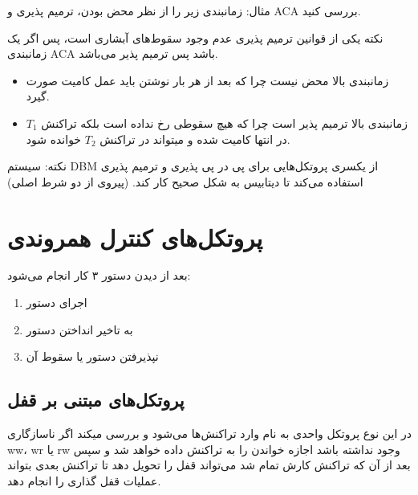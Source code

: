 \documentclass[a4paper]{article}
\begin{document}
مثال: زمانبندی زیر را از نظر محض بودن، ترمیم پذیری و ACA بررسی کنید.

نکته یکی از قوانین ترمیم پذیری عدم وجود سقوط‌های آبشاری است، پس اگر یک زمانبندی
ACA باشد پس ترمیم پذیر می‌باشد.

\begin{LTR}
    \begin{table}[h]
        \centering
    \end{table}
\end{LTR}

\begin{itemize}
    \item زمانبندی بالا محض نیست چرا که بعد از هر بار نوشتن باید عمل کامیت صورت
    گیرد.
    \item زمانبندی بالا ترمیم پذیر است چرا که هیچ سقوطی رخ نداده است بلکه تراکنش
    $T_{1}$ در انتها کامیت شده و میتواند در تراکنش $T_{2}$ خوانده شود.
\end{itemize}

نکته: سیستم DBM از یکسری پروتکل‌هایی برای پی در پی پذیری و ترمیم پذیری استفاده
می‌کند تا دیتابیس به شکل صحیح کار کند. (پیروی از دو شرط اصلی)

\section{پروتکل‌های کنترل همروندی}

بعد از دیدن دستور ۳ کار انجام می‌شود:

\begin{enumerate}
    \item اجرای دستور
    \item به تاخیر انداختن دستور
    \item نپذیرفتن دستور یا سقوط آن
\end{enumerate}

\subsection{پروتکل‌های مبتنی بر قفل}

در این نوع پروتکل واحدی به نام  وارد تراکنش‌ها می‌شود و بررسی
میکند اگر ناسازگاری ww، wr یا rw وجود نداشته باشد اجازه خواندن را به تراکنش داده
خواهد شد و سپس بعد از آن که تراکنش کارش تمام شد می‌تواند قفل را تحویل دهد تا
تراکنش بعدی بتواند عملیات قفل گذاری را انجام دهد.
\end{document}
